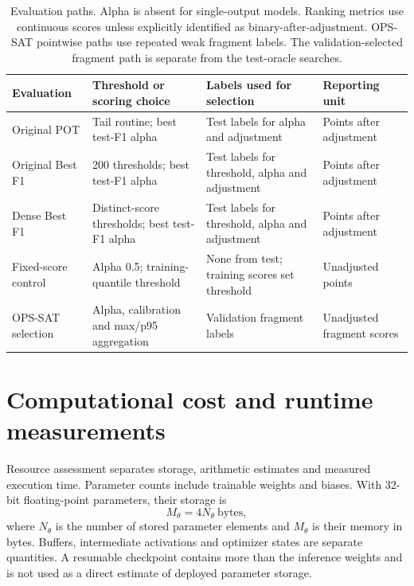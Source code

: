 \begin{table}[htbp]
  \centering
  \small
  \begin{tabularx}{\textwidth}{@{}l*{3}{>{\raggedright\arraybackslash}X}@{}}
    \toprule
    Evaluation & Threshold or scoring choice & Labels used for selection & Reporting unit \\
    \midrule
    Original POT & Tail routine; best test-F1 alpha & Test labels for alpha and adjustment & Points after adjustment \\
    Original Best F1 & \num{200} thresholds; best test-F1 alpha & Test labels for threshold, alpha and adjustment & Points after adjustment \\
    Dense Best F1 & Distinct-score thresholds; best test-F1 alpha & Test labels for threshold, alpha and adjustment & Points after adjustment \\
    Fixed-score control & Alpha \num{0.5}; training-quantile threshold & None from test; training scores set threshold & Unadjusted points \\
    \acs{OPS-SAT} selection & Alpha, calibration and max/p95 aggregation & Validation fragment labels & Unadjusted fragment scores \\
    \bottomrule
  \end{tabularx}
  \caption{Evaluation paths. Alpha is absent for single-output models.
  Ranking metrics use continuous scores unless explicitly identified as
  binary-after-adjustment. \acs{OPS-SAT} pointwise paths use repeated weak
  fragment labels. The validation-selected fragment path is separate from
  the test-oracle searches.}
  \label{tab:datasets-evaluations}
\end{table}

\section{Computational cost and runtime measurements}
\label{sec:datasets-resources}
Resource assessment separates storage, arithmetic estimates and measured
execution time. Parameter counts include trainable weights and biases.
With \num{32}-bit floating-point parameters, their storage is
\begin{equation}
  M_{\theta}=4N_{\theta}\ \text{bytes},
  \label{eq:datasets-parameter-storage}
\end{equation}
where \(N_{\theta}\) is the number of stored parameter elements and
\(M_{\theta}\) is their memory in bytes. Buffers, intermediate activations
and optimizer states are separate quantities. A resumable checkpoint
contains more than the inference weights and is not used as a direct
estimate of deployed parameter storage.

